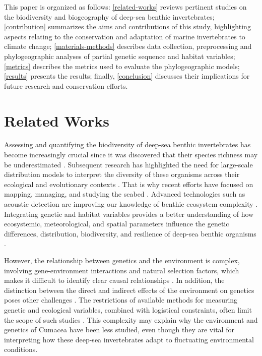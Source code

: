 This paper is organized as follows: \autoref{related-works} reviews pertinent studies on the biodiversity and biogeography of deep-sea benthic invertebrates; \autoref{contribution} summarizes the aims and contributions of this study, highlighting aspects relating to the conservation and adaptation of marine invertebrates to climate change; \autoref{materials-methods} describes data collection, preprocessing and phylogeographic analyses of partial genetic sequence and habitat variables; \autoref{metrics} describes the metrics used to evaluate the phylogeographic models; \autoref{results} presents the results; finally, \autoref{conclusion} discusses their implications for future research and conservation efforts.

\section{Related Works}\label{related-works}
Assessing and quantifying the biodiversity of deep-sea benthic invertebrates has become increasingly crucial since it was discovered that their species richness may be underestimated \citep{grassle1992deep}. Subsequent research has highlighted the need for large-scale distribution models to interpret the diversity of these organisms across their ecological and evolutionary contexts \citep{rex1997large}. That is why recent efforts have focused on mapping, managing, and studying the seabed \citep{brown2011benthic}. Advanced technologies such as acoustic detection are improving our knowledge of benthic ecosystem complexity \citep{brown2011benthic}. Integrating genetic and habitat variables provides a better understanding of how ecosystemic, meteorological, and spatial parameters influence the genetic differences, distribution, biodiversity, and resilience of deep-sea benthic organisms \citep{vrijenhoek2009cryptic}.

However, the relationship between genetics and the environment is complex, involving gene-environment interactions and natural selection factors, which makes it difficult to identify clear causal relationships \citep{balkenhol_identifying_2009}. In addition, the distinction between the direct and indirect effects of the environment on genetics poses other challenges \citep{manel_perspectives_2010, balkenhol_landscape_2019}. The restrictions of available methods for measuring genetic and ecological variables, combined with logistical constraints, often limit the scope of such studies \citep{manel_perspectives_2010, shafer_widespread_2013}. This complexity may explain why the environment and genetics of Cumacea have been less studied, even though they are vital for interpreting how these deep-sea invertebrates adapt to fluctuating environmental conditions.


